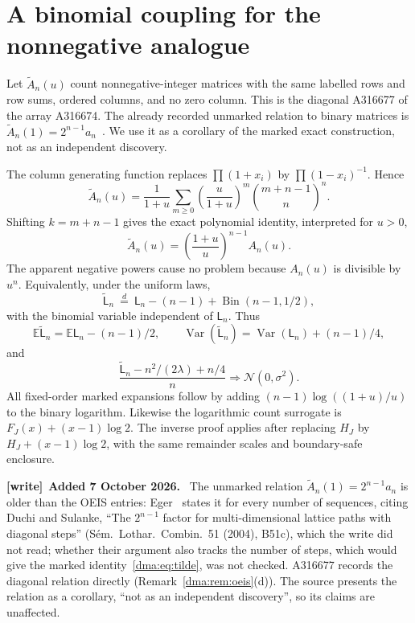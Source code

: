 \documentclass[11pt,letterpaper]{article}
\theoremstyle{remark}\newtheorem{remark}[theorem]{Remark}
\newcommand{\E}{\mathbb E}
\newcommand{\Var}{\operatorname{Var}}
\newcommand{\Normal}{\mathcal N}
\newenvironment{writenote}[1][]{\par\smallskip\begingroup\small
 \noindent\textbf{[write]}\if\relax\detokenize{#1}\relax\else~\textbf{#1.}\fi\ }%
 {\par\endgroup\smallskip}
\begin{document}
\section{A binomial coupling for the nonnegative analogue}\label{dma:sec:corollary}
Let $\widetilde A_n(u)$ count nonnegative-integer matrices with the same labelled rows and row sums, ordered columns, and no zero column. This is the diagonal A316677 of the array A316674. The already recorded unmarked relation to binary matrices is
$\widetilde A_n(1)=2^{n-1}a_n$~\cite{oeisnonnegative}. We use it as a corollary of the marked exact construction, not as an independent discovery.

The column generating function replaces $\prod(1+x_i)$ by $\prod(1-x_i)^{-1}$. Hence
\[
 \widetilde A_n(u)=\frac1{1+u}\sum_{m\geq0}\left(\frac u{1+u}\right)^m
 \binom{m+n-1}{n}^{\!n}.
\]
Shifting $k=m+n-1$ gives the exact polynomial identity, interpreted for $u>0$,
\begin{equation}\label{dma:eq:tilde}
 \widetilde A_n(u)=\left(\frac{1+u}{u}\right)^{n-1}A_n(u).
\end{equation}
The apparent negative powers cause no problem because $A_n(u)$ is divisible by $u^n$. Equivalently, under the uniform laws,
\begin{equation}\label{dma:eq:coupling}
 \widetilde{\mathsf L}_n\ \overset{d}=\
 \mathsf L_n-(n-1)+\operatorname{Bin}(n-1,1/2),
\end{equation}
with the binomial variable independent of $\mathsf L_n$. Thus
\[
 \E\widetilde{\mathsf L}_n=\E\mathsf L_n-(n-1)/2,\qquad
 \Var(\widetilde{\mathsf L}_n)=\Var(\mathsf L_n)+(n-1)/4,
\]
and
\[
 \frac{\widetilde{\mathsf L}_n-n^2/(2\lambda)+n/4}{n}
 \Longrightarrow\Normal(0,\sigma^2).
\]
All fixed-order marked expansions follow by adding $(n-1)\log((1+u)/u)$ to the binary logarithm. Likewise the logarithmic count surrogate is $F_J(x)+(x-1)\log2$. The inverse proof applies after replacing $H_J$ by $H_J+(x-1)\log2$, with the same remainder scales and boundary-safe enclosure.

\begin{writenote}[Added 7 October 2026]
The unmarked relation $\widetilde A_n(1)=2^{n-1}a_n$ is older than the OEIS
entries: Eger~\cite[Section~5.6]{eger} states it for every number of
sequences, citing Duchi and Sulanke, ``The $2^{n-1}$ factor for
multi-dimensional lattice paths with diagonal steps'' (S\'em.\ Lothar.\
Combin.\ 51 (2004), B51c), which the write did not read; whether their
argument also tracks the number of steps, which would give the marked
identity~\eqref{dma:eq:tilde}, was not checked. A316677 records the diagonal
relation directly (Remark~\ref{dma:rem:oeis}(d)). The source presents the
relation as a corollary, ``not as an independent discovery'', so its claims
are unaffected.
\end{writenote}
\end{document}
